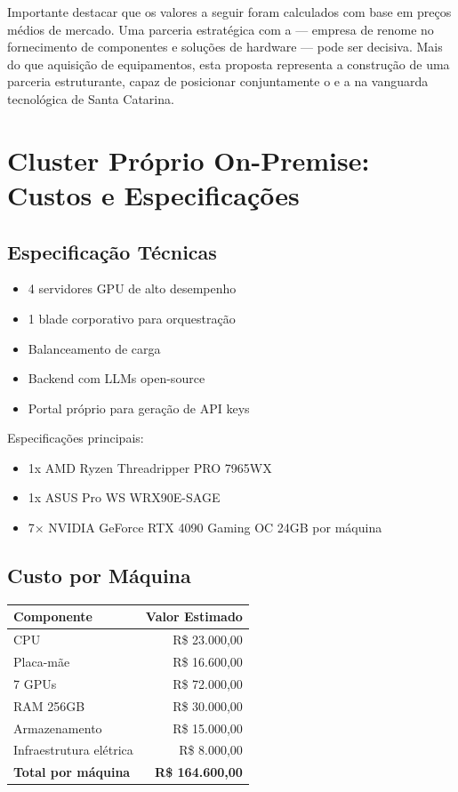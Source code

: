 \documentclass[12pt,a4paper,]{abntex2}
\begin{document}
Importante destacar que os valores a seguir foram calculados com base em preços médios de mercado. Uma parceria estratégica com a \empresaParceiraAbr — empresa de renome no fornecimento de componentes e soluções de hardware — pode ser decisiva.
Mais do que aquisição de equipamentos, esta proposta representa a construção de uma parceria estruturante, capaz de posicionar conjuntamente o \empresaExecutoraAbr e a \empresaParceiraAbr na vanguarda tecnológica de Santa Catarina.

\newpage
\chapter{Cluster Próprio On-Premise: Custos e Especificações}
\section{Especificação Técnicas}

\begin{itemize}
\item 4 servidores GPU de alto desempenho
\item 1 blade corporativo para orquestração
\item Balanceamento de carga
\item Backend com LLMs open-source
\item Portal próprio para geração de API keys
\end{itemize}

Especificações principais:

\begin{itemize}
\item 1x AMD Ryzen Threadripper PRO 7965WX
\item 1x ASUS Pro WS WRX90E-SAGE
\item 7× NVIDIA GeForce RTX 4090 Gaming OC 24GB por máquina
\end{itemize}

\section{Custo por Máquina}

\begin{table}[h]
\centering
\begin{tabular}{|l|r|}
\hline
\textbf{Componente} & \textbf{Valor Estimado} \\
\hline
CPU & R\$ 23.000,00 \\
Placa-mãe & R\$ 16.600,00 \\
7 GPUs & R\$ 72.000,00 \\
RAM 256GB & R\$ 30.000,00 \\
Armazenamento & R\$ 15.000,00 \\
Infraestrutura elétrica & R\$ 8.000,00 \\
\hline
\textbf{Total por máquina} & \textbf{R\$ 164.600,00} \\
\hline
\end{tabular}
\end{table}
\end{document}

